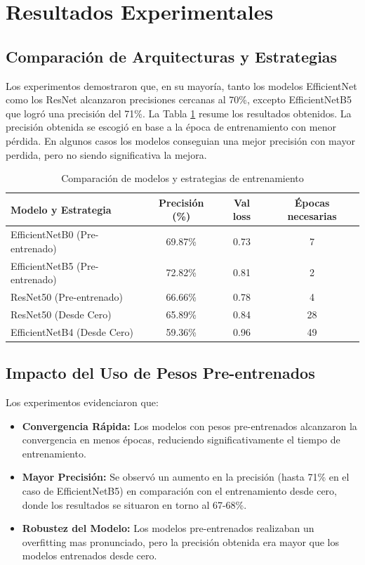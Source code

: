 \documentclass[11pt,spanish,listoffigures,listoftables]{tfgetsinf}
\begin{document}
\section{Resultados Experimentales}

\subsection{Comparación de Arquitecturas y Estrategias}
Los experimentos demostraron que, en su mayoría, tanto los modelos EfficientNet como los ResNet alcanzaron precisiones cercanas al 70\%, excepto EfficientNetB5 que logró una precisión del 71\%. La Tabla \ref{tab:resultados_experimentos} resume los resultados obtenidos.
La precisión obtenida se escogió en base a la época de entrenamiento con menor pérdida. En algunos casos los modelos conseguian una mejor precisión con mayor perdida, pero no siendo significativa la mejora.
\begin{table}[htbp]
\centering
\begin{tabular}{lccc}
\toprule
\textbf{Modelo y Estrategia} & \textbf{Precisión (\%)} & \textbf{Val loss} & \textbf{Épocas necesarias} \\
\midrule
EfficientNetB0 (Pre-entrenado)  & 69.87\%    & 0.73 & 7 \\
EfficientNetB5 (Pre-entrenado)  & 72.82\%    & 0.81 & 2 \\
ResNet50 (Pre-entrenado)        & 66.66\%    & 0.78 & 4 \\
ResNet50 (Desde Cero)           & 65.89\%    & 0.84 & 28 \\
EfficientNetB4 (Desde Cero)     & 59.36\%    & 0.96 & 49 \\

\bottomrule
\end{tabular}
\caption{Comparación de modelos y estrategias de entrenamiento}
\label{tab:resultados_experimentos}
\end{table}

\subsection{Impacto del Uso de Pesos Pre-entrenados}
Los experimentos evidenciaron que:
\begin{itemize}
    \item \textbf{Convergencia Rápida:} Los modelos con pesos pre-entrenados alcanzaron la convergencia en menos épocas, reduciendo significativamente el tiempo de entrenamiento.
    \item \textbf{Mayor Precisión:} Se observó un aumento en la precisión (hasta 71\% en el caso de EfficientNetB5) en comparación con el entrenamiento desde cero, donde los resultados se situaron en torno al 67-68\%.
    \item \textbf{Robustez del Modelo:} Los modelos pre-entrenados realizaban un overfitting mas pronunciado, pero la precisión obtenida era mayor que los modelos entrenados desde cero.
\end{itemize}
\end{document}
